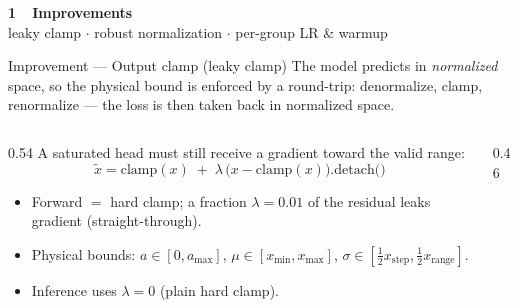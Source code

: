 \documentclass[aspectratio=169,10pt]{beamer}
\begin{document}
\begin{frame}[plain]
  \centering \vfill
  {\Large\bfseries\color{accent} 1\ \ Improvements}\\[4pt]
  {\small leaky clamp \; $\cdot$ \; robust normalization \; $\cdot$ \; per-group LR \& warmup}
  \vfill
\end{frame}

\begin{frame}{Improvement --- Output clamp (leaky clamp)}
  \small
  The model predicts in \emph{normalized} space, so the physical bound is enforced by a
  round-trip: denormalize, clamp, renormalize --- the loss is then taken back in normalized space.
  \begin{center}
  \end{center}
  \begin{columns}[T]
    \begin{column}{0.54\textwidth}
      A saturated head must still receive a gradient toward the valid range:
      \[
        \boxed{\ \tilde x = \mathrm{clamp}(x)\; +\; \lambda\,\big(x-\mathrm{clamp}(x)\big).\text{detach()}\ }
      \]
      \begin{itemize}\scriptsize
        \item Forward $=$ hard clamp; a fraction $\lambda=0.01$ of the residual leaks gradient (straight-through).
        \item Physical bounds: $a\!\in\![0,a_{\max}]$, $\mu\!\in\![x_{\min},x_{\max}]$,
              $\sigma\!\in\![\tfrac12 x_\text{step},\tfrac12 x_\text{range}]$.
        \item Inference uses $\lambda=0$ (plain hard clamp).
      \end{itemize}
    \end{column}
    \begin{column}{0.46\textwidth}

\end{column}
\end{columns}
\end{frame}
\end{document}
